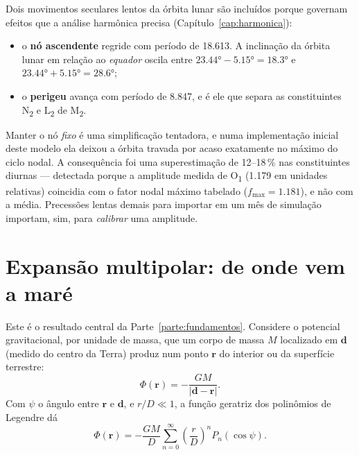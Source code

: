 \documentclass[11pt,a4paper,oneside]{report}
\theoremstyle{definition}
\theoremstyle{plain}
\theoremstyle{remark}
\newcommand{\vect}[1]{\bm{#1}}
\begin{document}
Dois movimentos seculares lentos da órbita lunar são incluídos porque governam
efeitos que a análise harmônica precisa (Capítulo~\ref{cap:harmonica}):

\begin{itemize}
\item o \textbf{nó ascendente} regride com período de \SI{18.613}{\anos}. A
  inclinação da órbita lunar em relação ao \emph{equador} oscila entre
  $\ang{23.44}-\ang{5.15}=\ang{18.3}$ e $\ang{23.44}+\ang{5.15}=\ang{28.6}$;
\item o \textbf{perigeu} avança com período de \SI{8.847}{\anos}, e é ele que
  separa as constituintes N\textsubscript{2} e L\textsubscript{2} de
  M\textsubscript{2}.
\end{itemize}

\begin{alerta}
Manter o nó \emph{fixo} é uma simplificação tentadora, e numa implementação
inicial deste modelo ela deixou a órbita travada por acaso exatamente no máximo
do ciclo nodal. A consequência foi uma superestimação de 12--18\,\% nas
constituintes diurnas — detectada porque a amplitude medida de
O\textsubscript{1} (\num{1.179} em unidades relativas) coincidia com o fator
nodal máximo tabelado ($f_{\max}=\num{1.181}$), e não com a média. Precessões
lentas demais para importar em um mês de simulação importam, sim, para
\emph{calibrar} uma amplitude.
\end{alerta}

\section{Expansão multipolar: de onde vem a maré}
\label{sec:multipolo}

Este é o resultado central da Parte~\ref{parte:fundamentos}. Considere o
potencial gravitacional, por unidade de massa, que um corpo de massa $M$
localizado em $\vect{d}$ (medido do centro da Terra) produz num ponto
$\vect{r}$ do interior ou da superfície terrestre:
\begin{equation}
\Phi(\vect{r})=-\frac{GM}{|\vect{d}-\vect{r}|}.
\end{equation}
Com $\psi$ o ângulo entre $\vect{r}$ e $\vect{d}$, e $r/D\ll 1$, a função
geratriz dos polinômios de Legendre dá
\begin{equation}
\boxed{\;
\Phi(\vect{r})=-\frac{GM}{D}\sum_{n=0}^{\infty}\left(\frac{r}{D}\right)^{n}
P_n(\cos\psi).\;}
\label{eq:multipolo}
\end{equation}
\end{document}
